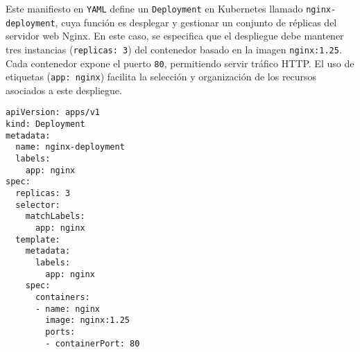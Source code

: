Este manifiesto en \texttt{YAML} define un \texttt{Deployment} en Kubernetes llamado \texttt{nginx-deployment}, cuya función es desplegar y gestionar un conjunto de réplicas del servidor web Nginx. En este caso, se especifica que el despliegue debe mantener tres instancias (\texttt{replicas: 3}) del contenedor basado en la imagen \texttt{nginx:1.25}. Cada contenedor expone el puerto \texttt{80}, permitiendo servir tráfico HTTP. El uso de etiquetas (\texttt{app: nginx}) facilita la selección y organización de los recursos asociados a este despliegue.

\begin{verbatim}
apiVersion: apps/v1
kind: Deployment
metadata:
  name: nginx-deployment
  labels:
    app: nginx
spec:
  replicas: 3
  selector:
    matchLabels:
      app: nginx
  template:
    metadata:
      labels:
        app: nginx
    spec:
      containers:
      - name: nginx
        image: nginx:1.25
        ports:
        - containerPort: 80
\end{verbatim}
